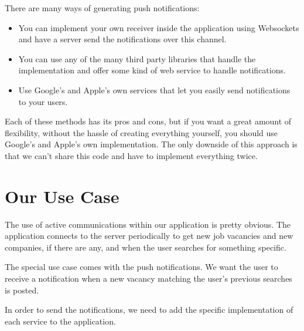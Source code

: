 There are many ways of generating push notifications:
\begin{itemize}
\item You can implement your own receiver inside the application using Websockets and have a server send the notifications over this channel.
\item You can use any of the many third party libraries that handle the implementation and offer some kind of web service to handle notifications.
\item Use Google's and Apple's own services that let you easily send notifications to your users.
\end{itemize}

Each of these methods has its pros and cons, but if you want a great amount of flexibility, without the hassle of creating everything yourself, you should use Google's and Apple's own implementation. The only downside of this approach is that we can't share this code and have to implement everything twice.


\section{Our Use Case}

The use of active communications within our application is pretty obvious. The application connects to the server periodically to get new job vacancies and new companies, if there are any, and when the user searches for something specific.

The special use case comes with the push notifications. We want the user to receive a notification when a new vacancy matching the user's previous searches is posted.

In order to send the notifications, we need to add the specific implementation of each service to the application.

